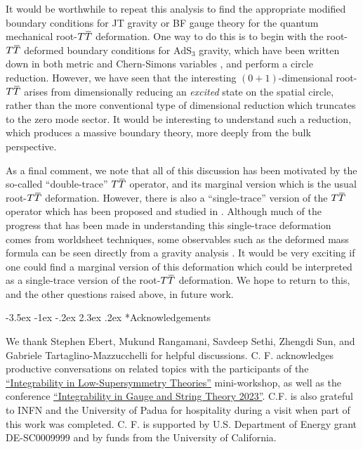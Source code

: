 \documentclass[12pt]{article}
\makeatletter
\numberwithin{equation}{section}
\renewcommand\section{\@startsection {section}{1}{\z@}%
                                   {-3.5ex \@plus -1ex \@minus -.2ex}%
                                   {2.3ex \@plus.2ex}%
                                   {\normalfont\large\bfseries}}
\newcommand{\overbar}[1]{\mkern 1.5mu\overline{\mkern-1.5mu#1\mkern-1.5mu}\mkern 1.5mu}
\def\TT{{T\overbar{T}}}
\makeatother
\begin{document}
It would be worthwhile to repeat this analysis to find the appropriate modified boundary conditions for JT gravity or BF gauge theory for the quantum mechanical root-$\TT$ deformation. One way to do this is to begin with the root-$\TT$ deformed boundary conditions for $\mathrm{AdS}_3$ gravity, which have been written down in both metric and Chern-Simons variables \cite{Ebert:2023tih}, and perform a circle reduction. However, we have seen that the interesting $(0+1)$-dimensional root-$\TT$ arises from dimensionally reducing an \emph{excited} state on the spatial circle, rather than the more conventional type of dimensional reduction which truncates to the zero mode sector. It would be interesting to understand such a reduction, which produces a massive boundary theory, more deeply from the bulk perspective.

As a final comment, we note that all of this discussion has been motivated by the so-called ``double-trace'' $\TT$ operator, and its marginal version which is the usual root-$\TT$ deformation. However, there is also a ``single-trace'' version of the $\TT$ operator which has been proposed and studied in \cite{Giveon:2017nie,Giveon:2017myj}. Although much of the progress that has been made in understanding this single-trace deformation comes from worldsheet techniques, some observables such as the deformed mass formula can be seen directly from a gravity analysis \cite{Chang:2023kkq}. It would be very exciting if one could find a marginal version of this deformation which could be interpreted as a single-trace version of the root-$\TT$ deformation. We hope to return to this, and the other questions raised above, in future work.

\section*{Acknowledgements}

We thank Stephen Ebert, Mukund Rangamani, Savdeep Sethi, Zhengdi Sun, and Gabriele Tartaglino-Mazzucchelli for helpful discussions. C. F. acknowledges productive conversations on related topics with the participants of the \href{https://sites.google.com/view/intropea2023/home#h.ksnkkrrvun8q}{``Integrability in Low-Supersymmetry Theories''} mini-workshop, as well as the conference \href{https://indico.phys.ethz.ch/event/49/}{``Integrability in Gauge and String Theory 2023''}. C.F. is also grateful to INFN and the University of Padua for hospitality during a visit when part of this work was completed. C. F. is supported by U.S. Department of Energy grant DE-SC0009999 and by funds from the University of California.
\end{document}
